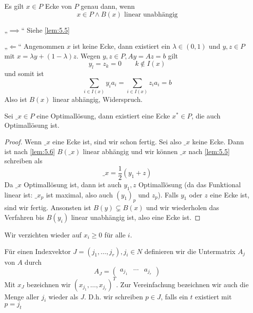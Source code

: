 \documentclass[a4paper]{scrartcl}
\numberwithin{equation}{section}
\begin{document}
\begin{lem}
	\label{lem:5.6}
	Es gilt $x\in P$ Ecke von $P$ genau dann, wenn
	\[
		x\in P \land B(x) \text{ linear unabhängig}
	\]
	\begin{seg}{„$\implies$“}
		Siehe \ref{lem:5.5}
	\end{seg}
	\begin{seg}{„$\Longleftarrow$“}
		Angenommen $x$ ist keine Ecke, dann existiert ein $\lambda\in (0,1)$ und $y,z\in P$ mit $x=\lambda y + (1-\lambda)z$.
		Wegen $y,z\in P, Ay = Az = b$ gilt
		\[
			y_l = z_k = 0 \qquad k\not\in I(x)
		\]
		und somit ist
		\[
			\sum_{i\in I(x)}y_i a_i = \sum_{i\in I(x)}z_ia_i = b
		\]
		Also ist $B(x)$ linear abhängig, Widerspruch.
	\end{seg}
\end{lem}

\begin{st}
	Sei $\_x\in P$ eine Optimallösung, dann existiert eine Ecke $x^*\in P$, die auch Optimallösung ist.
	\begin{proof}
		Wenn $\_x$ eine Ecke ist, sind wir schon fertig.
		Sei also $\_x$ keine Ecke.
		Dann ist nach \ref{lem:5.6} $B(\_x)$ linear abhängig und wir können $\_x$ nach \ref{lem:5.5} schreiben als
		\[
			\_x = \frac 12(y_1 + z)
		\]
		Da $\_x$ Optimallösung ist, dann ist auch $y_1,z$ Optimallösung (da das Funktional linear ist: $\_x_p$ ist maximal, also auch $(y_1)_p$ und $z_p$).
		Falls $y_1$ oder $z$ eine Ecke ist, sind wir fertig.
		Ansonsten ist $B(y)\subsetneq B(x)$ und wir wiederholen das Verfahren bis $B(y_i)$ linear unabhängig ist, also eine Ecke ist.
	\end{proof}
\end{st}

Wir verzichten wieder auf $x_i\ge 0$ für alle $i$.

Für einen Indexvektor $J=(j_1,\dotsc, j_r), j_i\in N$ definieren wir die Untermatrix $A_j$ von $A$ durch
\[
	A_J = \begin{pmatrix}a_{j_1} & \cdots & a_{j_r}\end{pmatrix}
\]
Mit $x_J$ bezeichnen wir $(x_{j_1},\dotsc,x_{j_r})^T$.
Zur Vereinfachung bezeichnen wir auch die Menge aller $j_i$ wieder als $J$.
D.h. wir schreiben $p\in J$, falls ein $t$ existiert mit $p=j_t$
\end{document}
